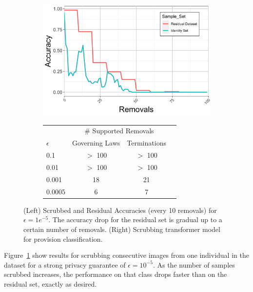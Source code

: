 \begin{figure}
\begin{subfigure}{0.45\columnwidth}\centering
    \includegraphics[width=0.98\columnwidth]{5_unlearn/figs/scrub/VGG_Scrub_1.png}%
    \label{fig:vgg}
\end{subfigure}
\begin{subfigure}{0.45\columnwidth}
    \centering
    \begin{tabular}[b]{l|ccc}
        \hline\hline
        & \multicolumn{2}{c}{\# Supported Removals}  \\
        $\epsilon$ & Governing Laws & Terminations \\
        \hline
        0.1 & $>$ 100 & $>$ 100 \\
        0.01 & $>$ 100 & $>$ 100 \\
        0.001 & 18 & 21 \\
        0.0005 & 6 & 7 \\
        \hline\hline
    \end{tabular}%
    \label{tab:nlp}
\end{subfigure}

\caption[Removal performance in pretrained models]{(Left) Scrubbed and Residual Accuracies (every 10 removals) for $\epsilon = 1e^{-5}$. The accuracy drop for the residual set is gradual up to a certain number of removals. (Right) Scrubbing transformer model for provision classification.}
\label{fig:combine}
\end{figure}

Figure~\ref{fig:vgg} show results for scrubbing consecutive images from one individual in the dataset for a strong privacy guarantee of $\epsilon=10^{-5}$. As the number of samples scrubbed increases, the performance on that class drops faster than on the residual set, exactly as desired.

